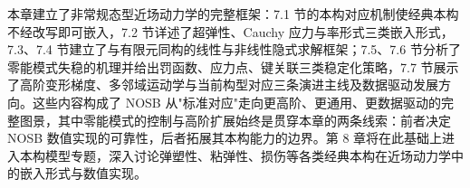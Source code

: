 本章建立了非常规态型近场动力学的完整框架：7.1 节的本构对应机制使经典本构不经改写即可嵌入，7.2 节详述了超弹性、Cauchy 应力与率形式三类嵌入形式，7.3、7.4 节建立了与有限元同构的线性与非线性隐式求解框架；7.5、7.6 节分析了零能模式失稳的机理并给出罚函数、应力点、键关联三类稳定化策略，7.7 节展示了高阶变形梯度、多邻域运动学与当前构型对应三条演进主线及数据驱动发展方向。这些内容构成了 NOSB 从"标准对应"走向更高阶、更通用、更数据驱动的完整图景，其中零能模式的控制与高阶扩展始终是贯穿本章的两条线索：前者决定 NOSB 数值实现的可靠性，后者拓展其本构能力的边界。第 8 章将在此基础上进入本构模型专题，深入讨论弹塑性、粘弹性、损伤等各类经典本构在近场动力学中的嵌入形式与数值实现。
